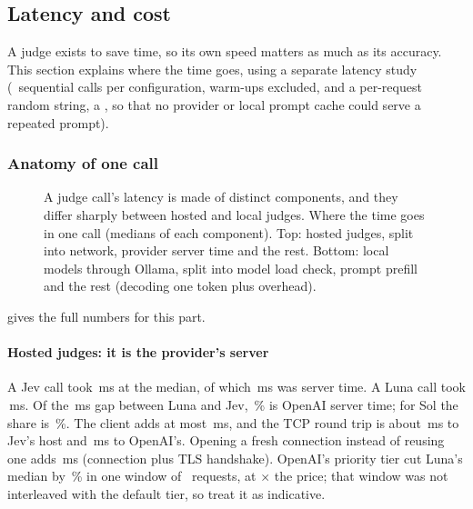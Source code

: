 \subsection{Latency and cost}\label{jb:sec:latency}

A judge exists to save time, so its own speed matters as much as its accuracy. This section explains
where the time goes, using a separate latency study (\LatNSeq\ sequential calls per configuration,
warm-ups excluded, and a per-request random string, a , so that no provider or local prompt
cache could serve a repeated prompt).

\subsubsection{Anatomy of one call}

\begin{figure}[tbp]
\centering

\caption{A judge call's latency is made of distinct components, and they differ sharply between hosted and local judges. Where the time goes in one call (medians of each component). Top: hosted judges, split into
network, provider server time and the rest. Bottom: local models through Ollama, split into model
load check, prompt prefill and the rest (decoding one token plus overhead).}
\label{jb:fig:anatomy}
\end{figure}

 gives the full numbers for this part.

\begin{table}[tbp]
\centering\small
\caption{The numbers behind \cref{jb:fig:anatomy}. Components are separate medians, so they need not add
exactly to the median wall time; the residual is shown as ``rest.''}
\label{jb:tab:anatomy}

\end{table}

\paragraph{Hosted judges: it is the provider's server} A Jev call took \LatJevWall\,ms at the median,
of which \LatJevServer\,ms was server time. A Luna call took \LatLunaWall\,ms. Of the
\LatLunaGap\,ms gap between Luna and Jev, \LatLunaServerShare\,\% is OpenAI server time; for Sol the
share is \LatSolServerShare\,\%. The client adds at most \LatClientMax\,ms, and the TCP round trip is
about \LatRttJev\,ms to Jev's host and \LatRttOpenAI\,ms to OpenAI's. Opening a fresh connection
instead of reusing one adds \LatFreshRange\,ms (connection plus TLS handshake). OpenAI's priority tier cut
Luna's median by \LatPrioCut\,\% in one window of \LatPrioN\ requests, at \PriorityMultiplier$\times$ the
price; that window was not interleaved with the default tier, so treat it as indicative.

